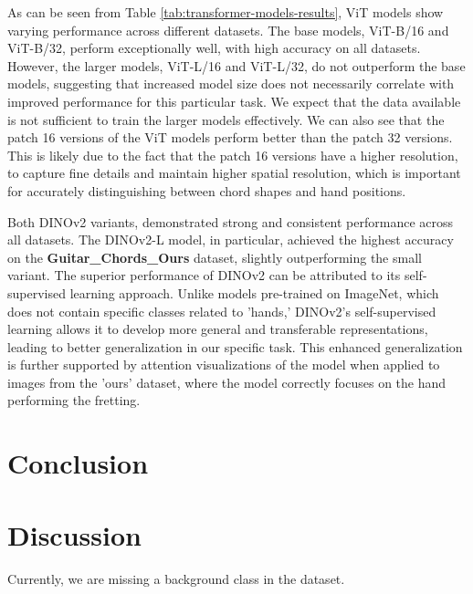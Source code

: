 \documentclass[10pt,twocolumn,letterpaper]{article}
\begin{document}
As can be seen from Table \ref{tab:transformer-models-results}, ViT models show varying performance across different datasets. The base models, ViT-B/16 and ViT-B/32, perform exceptionally well, with high accuracy on all datasets. However, the larger models, ViT-L/16 and ViT-L/32, do not outperform the base models, suggesting that increased model size does not necessarily correlate with improved performance for this particular task. We expect that the data available is not sufficient to train the larger models effectively. We can also see that the patch 16 versions of the ViT models perform better than the patch 32 versions. This is likely due to the fact that the patch 16 versions have a higher resolution, to capture fine details and maintain higher spatial resolution, which is important for accurately distinguishing between chord shapes and hand positions.

Both DINOv2 variants, demonstrated strong and consistent performance across all datasets. The DINOv2-L model, in particular, achieved the highest accuracy on the \textbf{Guitar\_Chords\_Ours} dataset, slightly outperforming the small variant. The superior performance of DINOv2 can be attributed to its self-supervised learning approach. Unlike models pre-trained on ImageNet, which does not contain specific classes related to 'hands,' DINOv2's self-supervised learning allows it to develop more general and transferable representations, leading to better generalization in our specific task. This enhanced generalization is further supported by attention visualizations of the model when applied to images from the 'ours' dataset, where the model correctly focuses on the hand performing the fretting.

\section{Conclusion}

\section{Discussion}
Currently, we are missing a background class in the dataset.


 {\small
  
  
 }
\end{document}
